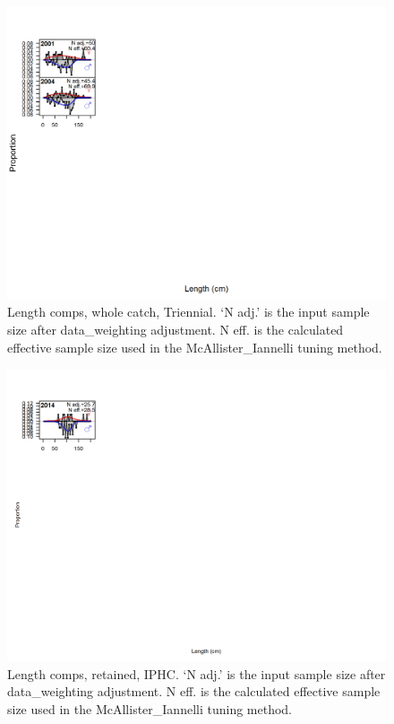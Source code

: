 \documentclass[12pt,]{article}
\begin{document}
\begin{figure}
\centering
\includegraphics{./r4ss/plots_mod1/comp_lenfit_flt6mkt0.png}
\caption{Length comps, whole catch, Triennial. `N adj.' is the input
sample size after data\_weighting adjustment. N eff. is the calculated
effective sample size used in the McAllister\_Iannelli tuning method.
\label{fig:mod1_4_comp_lenfit_flt6mkt0}}
\end{figure}

\begin{figure}
\centering
\includegraphics{./r4ss/plots_mod1/comp_lenfit_flt7mkt2.png}
\caption{Length comps, retained, IPHC. `N adj.' is the input sample size
after data\_weighting adjustment. N eff. is the calculated effective
sample size used in the McAllister\_Iannelli tuning method.
\label{fig:mod1_5_comp_lenfit_flt7mkt2}}
\end{figure}
\end{document}
